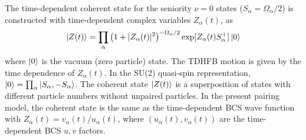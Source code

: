 \documentclass[%
superscriptaddress,
showpacs,
nofootinbib,
amsmath,amssymb,
aps,
prc,
twocolumn,
floatfix ]%
{revtex4-1}
\begin{document}
The time-dependent coherent state for the seniority $\nu=0$ states
($S_\alpha=\Omega_\alpha/2$) is constructed with
time-dependent complex variables $Z_\alpha(t)$, as
\begin{equation}
	\ket{Z(t)} = \prod_{\alpha} \left(1+|Z_\alpha(t)|^2\right)^{-\Omega_\alpha/2}
	\exp [Z_\alpha(t) S_\alpha^{+}] \ket{0}
 \label{coherent}
\end{equation}
where $\ket{0}$ is the vacuum (zero particle) state.
The TDHFB motion is given by the time dependence of $Z_\alpha(t)$.
In the SU(2) quasi-spin representation,
$\ket{0}=\prod_\alpha \ket{S_\alpha,-S_\alpha}$.
The coherent state $\ket{Z(t)}$ is a superposition of
states with different particle numbers
without unpaired particles.
In the present pairing model,
the coherent state is the same as the time-dependent BCS wave function
with $Z_\alpha(t)=v_\alpha(t)/u_\alpha(t)$,
where $(u_\alpha(t),v_\alpha(t))$ are the time-dependent BCS $u,v$ factors.
\end{document}
